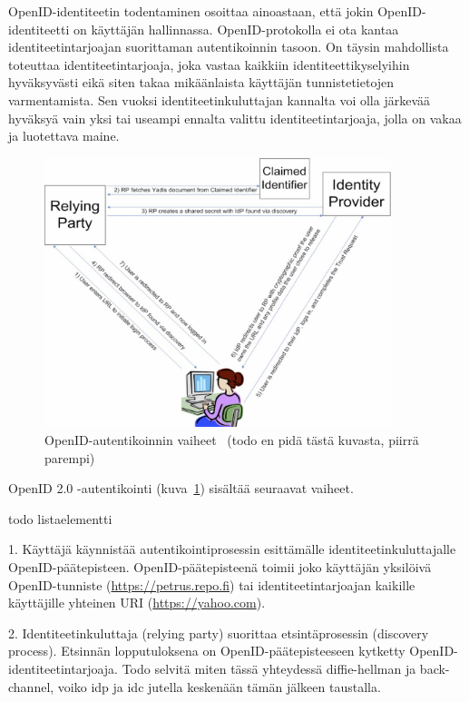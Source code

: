 \documentclass[finnish,gradu]{tktltiki}
\begin{document}
  OpenID-identiteetin todentaminen osoittaa ainoastaan, että jokin OpenID-identiteetti on käyttäjän hallinnassa. OpenID-protokolla ei ota kantaa identiteetintarjoajan suorittaman autentikoinnin tasoon. On täysin mahdollista toteuttaa identiteetintarjoaja, joka vastaa kaikkiin identiteettikyselyihin hyväksyvästi eikä siten takaa mikäänlaista käyttäjän tunnistetietojen varmentamista. Sen vuoksi identiteetinkuluttajan kannalta voi olla järkevää hyväksyä vain yksi tai useampi ennalta valittu identiteetintarjoaja, jolla on vakaa ja luotettava maine.


  \begin{figure}
    \centering
    \includegraphics[width=0.9\textwidth]{images/openid_flow_recordon06.jpg}
    \caption{OpenID-autentikoinnin vaiheet~\cite{openid_recordon_2009} (todo en pidä tästä kuvasta, piirrä parempi)}
    \label{fig:basic_openid_flow}
  \end{figure}

  OpenID 2.0 -autentikointi (kuva~\ref{fig:basic_openid_flow}) sisältää seuraavat vaiheet.

  todo listaelementti

  1. Käyttäjä käynnistää autentikointiprosessin esittämälle identiteetinkuluttajalle OpenID-päätepisteen. OpenID-päätepisteenä toimii joko käyttäjän yksilöivä OpenID-tunniste (\url{https://petrus.repo.fi}) tai identiteetintarjoajan kaikille käyttäjille yhteinen URI (\url{https://yahoo.com}).

  2. Identiteetinkuluttaja (relying party) suorittaa etsintäprosessin (discovery process). Etsinnän lopputuloksena on OpenID-päätepisteeseen kytketty OpenID-identiteetintarjoaja. Todo selvitä miten tässä yhteydessä diffie-hellman ja back-channel, voiko idp ja idc jutella keskenään tämän jälkeen taustalla.
\end{document}
